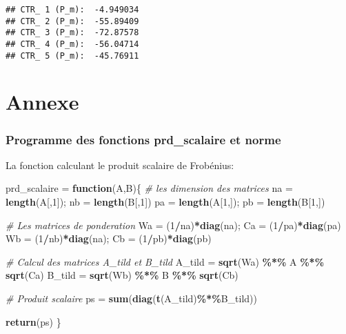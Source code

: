 \documentclass[
]{article}
\newenvironment{Shaded}{\begin{snugshade}}{\end{snugshade}}
\newcommand{\CommentTok}[1]{\textcolor[rgb]{0.56,0.35,0.01}{\textit{#1}}}
\newcommand{\ControlFlowTok}[1]{\textcolor[rgb]{0.13,0.29,0.53}{\textbf{#1}}}
\newcommand{\DecValTok}[1]{\textcolor[rgb]{0.00,0.00,0.81}{#1}}
\newcommand{\FunctionTok}[1]{\textcolor[rgb]{0.13,0.29,0.53}{\textbf{#1}}}
\newcommand{\NormalTok}[1]{#1}
\newcommand{\OtherTok}[1]{\textcolor[rgb]{0.56,0.35,0.01}{#1}}
\newcommand{\SpecialCharTok}[1]{\textcolor[rgb]{0.81,0.36,0.00}{\textbf{#1}}}
\begin{document}
\begin{verbatim}
## CTR_ 1 (P_m):  -4.949034 
## CTR_ 2 (P_m):  -55.89409 
## CTR_ 3 (P_m):  -72.87578 
## CTR_ 4 (P_m):  -56.04714 
## CTR_ 5 (P_m):  -45.76911
\end{verbatim}

\hypertarget{annexe}{%
\section{Annexe}\label{annexe}}

\hypertarget{programme-des-fonctions-prd_scalaire-et-norme}{%
\subsubsection{Programme des fonctions prd\_scalaire et
norme}\label{programme-des-fonctions-prd_scalaire-et-norme}}

La fonction calculant le produit scalaire de Frobénius:

\begin{Shaded}
\begin{Highlighting}[]
\NormalTok{prd\_scalaire }\OtherTok{=} \ControlFlowTok{function}\NormalTok{(A,B)\{}
  \CommentTok{\# les dimension des matrices}
\NormalTok{  na }\OtherTok{=} \FunctionTok{length}\NormalTok{(A[,}\DecValTok{1}\NormalTok{]); nb }\OtherTok{=} \FunctionTok{length}\NormalTok{(B[,}\DecValTok{1}\NormalTok{])}
\NormalTok{  pa }\OtherTok{=} \FunctionTok{length}\NormalTok{(A[}\DecValTok{1}\NormalTok{,]); pb }\OtherTok{=} \FunctionTok{length}\NormalTok{(B[}\DecValTok{1}\NormalTok{,])}
  
  \CommentTok{\# Les matrices de ponderation}
\NormalTok{  Wa }\OtherTok{=}\NormalTok{ (}\DecValTok{1}\SpecialCharTok{/}\NormalTok{na)}\SpecialCharTok{*}\FunctionTok{diag}\NormalTok{(na); Ca }\OtherTok{=}\NormalTok{ (}\DecValTok{1}\SpecialCharTok{/}\NormalTok{pa)}\SpecialCharTok{*}\FunctionTok{diag}\NormalTok{(pa)}
\NormalTok{  Wb }\OtherTok{=}\NormalTok{ (}\DecValTok{1}\SpecialCharTok{/}\NormalTok{nb)}\SpecialCharTok{*}\FunctionTok{diag}\NormalTok{(na); Cb }\OtherTok{=}\NormalTok{ (}\DecValTok{1}\SpecialCharTok{/}\NormalTok{pb)}\SpecialCharTok{*}\FunctionTok{diag}\NormalTok{(pb)}
  
  \CommentTok{\# Calcul des matrices A\_tild et B\_tild}
\NormalTok{  A\_tild }\OtherTok{=} \FunctionTok{sqrt}\NormalTok{(Wa) }\SpecialCharTok{\%*\%}\NormalTok{ A }\SpecialCharTok{\%*\%} \FunctionTok{sqrt}\NormalTok{(Ca)}
\NormalTok{  B\_tild }\OtherTok{=} \FunctionTok{sqrt}\NormalTok{(Wb) }\SpecialCharTok{\%*\%}\NormalTok{ B }\SpecialCharTok{\%*\%} \FunctionTok{sqrt}\NormalTok{(Cb)}
  
  \CommentTok{\# Produit scalaire}
\NormalTok{  ps }\OtherTok{=} \FunctionTok{sum}\NormalTok{(}\FunctionTok{diag}\NormalTok{(}\FunctionTok{t}\NormalTok{(A\_tild)}\SpecialCharTok{\%*\%}\NormalTok{B\_tild))}
  
  \FunctionTok{return}\NormalTok{(ps)}
\NormalTok{ \}}
\end{Highlighting}
\end{Shaded}
\end{document}
